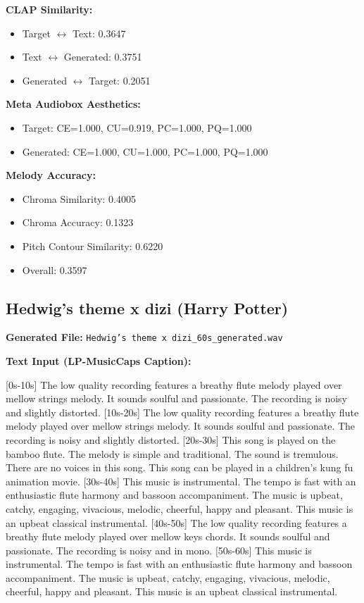 \documentclass{article}
\begin{document}
\textbf{CLAP Similarity:}
\begin{itemize}
    \item Target $\leftrightarrow$ Text: 0.3647
    \item Text $\leftrightarrow$ Generated: 0.3751
    \item Generated $\leftrightarrow$ Target: 0.2051
\end{itemize}

\textbf{Meta Audiobox Aesthetics:}
\begin{itemize}
    \item Target: CE=1.000, CU=0.919, PC=1.000, PQ=1.000
    \item Generated: CE=1.000, CU=1.000, PC=1.000, PQ=1.000
\end{itemize}

\textbf{Melody Accuracy:}
\begin{itemize}
    \item Chroma Similarity: 0.4005
    \item Chroma Accuracy: 0.1323
    \item Pitch Contour Similarity: 0.6220
    \item Overall: 0.3597
\end{itemize}

\subsection{Hedwig's theme x dizi (Harry Potter)}

\textbf{Generated File:} \texttt{Hedwig's theme x dizi\_60s\_generated.wav}

\textbf{Text Input (LP-MusicCaps Caption):}

\small
[0s-10s] The low quality recording features a breathy flute melody played over mellow strings melody. It sounds soulful and passionate. The recording is noisy and slightly distorted. [10s-20s] The low quality recording features a breathy flute melody played over mellow strings melody. It sounds soulful and passionate. The recording is noisy and slightly distorted. [20s-30s] This song is played on the bamboo flute. The melody is simple and traditional. The sound is tremulous. There are no voices in this song. This song can be played in a children's kung fu animation movie. [30s-40s] This music is instrumental. The tempo is fast with an enthusiastic flute harmony and bassoon accompaniment. The music is upbeat, catchy, engaging, vivacious, melodic, cheerful, happy and pleasant. This music is an upbeat classical instrumental. [40s-50s] The low quality recording features a breathy flute melody played over mellow keys chords. It sounds soulful and passionate. The recording is noisy and in mono. [50s-60s] This music is instrumental. The tempo is fast with an enthusiastic flute harmony and bassoon accompaniment. The music is upbeat, catchy, engaging, vivacious, melodic, cheerful, happy and pleasant. This music is an upbeat classical instrumental.
\normalsize
\end{document}
